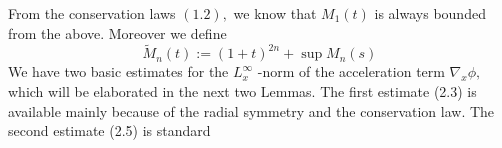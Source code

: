 From the conservation laws $(1.2),$ we know that $M_{1}(t)$ is always bounded from the above. Moreover we define
\[
\tilde{M}_{n}(t):=(1+t)^{2 n}+\sup M_{n}(s)
\]
We have two basic estimates for the $L_{x}^{\infty}$ -norm of the acceleration term $\nabla_{x} \phi,$ which will be elaborated in the next two Lemmas. The first estimate (2.3) is available mainly because of the radial symmetry and the conservation law. The second estimate (2.5) is standard 




